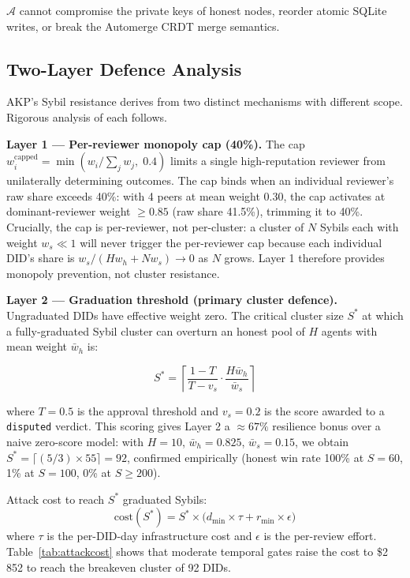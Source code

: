 \documentclass[10pt,twocolumn]{article}
\begin{document}
$\mathcal{A}$ cannot compromise the private keys of honest nodes, reorder
atomic SQLite writes, or break the Automerge CRDT merge semantics.

\subsection{Two-Layer Defence Analysis}

AKP's Sybil resistance derives from two distinct mechanisms with different
scope. Rigorous analysis of each follows.

\textbf{Layer 1 — Per-reviewer monopoly cap (40\%).}
The cap $w_i^{\text{capped}} = \min(w_i/\sum_j w_j,\;0.4)$ limits a single
high-reputation reviewer from unilaterally determining outcomes. The cap
binds when an individual reviewer's raw share exceeds 40\%: with 4 peers
at mean weight 0.30, the cap activates at dominant-reviewer weight $\geq
0.85$ (raw share 41.5\%), trimming it to 40\%. Crucially, the cap is
per-reviewer, not per-cluster: a cluster of $N$ Sybils each with weight
$w_s \ll 1$ will never trigger the per-reviewer cap because each
individual DID's share is $w_s / (H w_h + N w_s) \to 0$ as $N$ grows.
Layer 1 therefore provides monopoly prevention, not cluster resistance.

\textbf{Layer 2 — Graduation threshold (primary cluster defence).}
Ungraduated DIDs have effective weight zero. The critical cluster size
$S^*$ at which a fully-graduated Sybil cluster can overturn an honest
pool of $H$ agents with mean weight $\bar{w}_h$ is:

\[
  S^* = \left\lceil \frac{1 - T}{T - v_s} \cdot \frac{H\bar{w}_h}{\bar{w}_s} \right\rceil
\]

where $T = 0.5$ is the approval threshold and $v_s = 0.2$ is the score
awarded to a \texttt{disputed} verdict. This scoring gives Layer 2 a
$\approx 67\%$ resilience bonus over a naive zero-score model: with
$H=10$, $\bar{w}_h=0.825$, $\bar{w}_s=0.15$, we obtain
$S^* = \lceil(5/3)\times 55\rceil = 92$, confirmed empirically
(honest win rate 100\% at $S=60$, 1\% at $S=100$, 0\% at $S\geq 200$).

Attack cost to reach $S^*$ graduated Sybils:
\[
  \text{cost}(S^*) = S^* \times \bigl(d_{\min} \times \tau + r_{\min} \times \epsilon\bigr)
\]
where $\tau$ is the per-DID-day infrastructure cost and $\epsilon$ is the
per-review effort. Table~\ref{tab:attackcost} shows that moderate temporal
gates raise the cost to \$2\,852 to reach the breakeven cluster of 92 DIDs.
\end{document}

